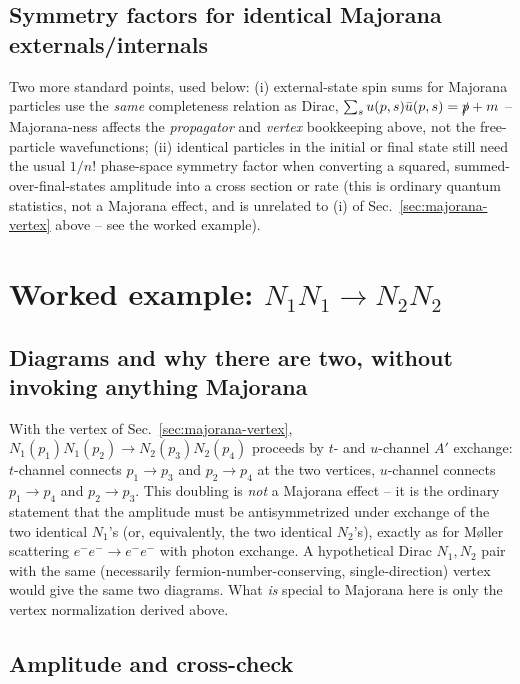 \documentclass[11pt,a4paper]{article}
\begin{document}
\subsection{Symmetry factors for identical Majorana externals/internals}

Two more standard points, used below: (i) external-state spin sums for
Majorana particles use the \emph{same} completeness relation as Dirac,
$\sum_su(p,s)\bar u(p,s)=\slashed p+m$ -- Majorana-ness affects the
\emph{propagator} and \emph{vertex} bookkeeping above, not the free-particle
wavefunctions; (ii) identical particles in the initial or final state still
need the usual $1/n!$ phase-space symmetry factor when converting a squared,
summed-over-final-states amplitude into a cross section or rate (this is
ordinary quantum statistics, not a Majorana effect, and is unrelated to (i)
of Sec.~\ref{sec:majorana-vertex} above -- see the worked example).

\section{Worked example: \texorpdfstring{$N_1N_1\to N_2N_2$}{N1N1->N2N2}}
\label{sec:NNtoNN}

\subsection{Diagrams and why there are two, without invoking anything Majorana}

With the vertex of Sec.~\ref{sec:majorana-vertex}, $N_1(p_1)N_1(p_2)\to
N_2(p_3)N_2(p_4)$ proceeds by $t$- and $u$-channel $A'$ exchange: $t$-channel
connects $p_1\!\to\!p_3$ and $p_2\!\to\!p_4$ at the two vertices, $u$-channel
connects $p_1\!\to\!p_4$ and $p_2\!\to\!p_3$. This doubling is \emph{not} a
Majorana effect -- it is the ordinary statement that the amplitude must be
antisymmetrized under exchange of the two identical $N_1$'s (or, equivalently,
the two identical $N_2$'s), exactly as for M{\o}ller scattering
$e^-e^-\to e^-e^-$ with photon exchange. A hypothetical Dirac $N_1,N_2$ pair
with the same (necessarily fermion-number-conserving, single-direction)
vertex would give the same two diagrams. What \emph{is} special to Majorana
here is only the vertex normalization derived above.

\subsection{Amplitude and cross-check}
\end{document}
